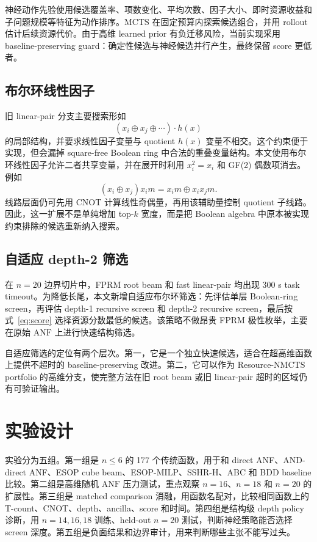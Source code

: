 \documentclass[UTF8,fontset=macnew,11pt]{ctexart}
\newcommand{\method}{Resource-NMCTS}
\newcommand{\anf}{\ensuremath{\mathrm{ANF}}}
\newcommand{\mcts}{\ensuremath{\mathrm{MCTS}}}
\begin{document}
神经动作先验使用候选覆盖率、项数变化、平均次数、因子大小、即时资源收益和子问题规模等特征为动作排序。\mcts{} 在固定预算内探索候选组合，并用 rollout 估计后续资源代价。由于高维 learned prior 有负迁移风险，当前实现采用 baseline-preserving guard：确定性候选与神经候选并行产生，最终保留 score 更低者。

\subsection{布尔环线性因子}

旧 linear-pair 分支主要搜索形如
\begin{equation}
  (x_i\oplus x_j\oplus\cdots)\cdot h(x)
  \label{eq:linear_factor}
\end{equation}
的局部结构，并要求线性因子变量与 quotient $h(x)$ 变量不相交。这个约束便于实现，但会漏掉 square-free Boolean ring 中合法的重叠变量结构。本文使用布尔环线性因子允许二者共享变量，并在展开时利用 $x_i^2=x_i$ 和 GF(2) 偶数项消去。例如
\begin{equation}
  (x_i\oplus x_j)x_i m = x_i m \oplus x_i x_j m .
  \label{eq:boolean_ring}
\end{equation}
线路层面仍可先用 CNOT 计算线性奇偶量，再用该辅助量控制 quotient 子线路。因此，这一扩展不是单纯增加 top-$k$ 宽度，而是把 Boolean algebra 中原本被实现约束排除的候选重新纳入搜索。

\subsection{自适应 depth-2 筛选}

在 $n=20$ 边界切片中，FPRM root beam 和 fast linear-pair 均出现 300 s task timeout。为降低长尾，本文新增自适应布尔环筛选：先评估单层 Boolean-ring screen，再评估 depth-1 recursive screen 和 depth-2 recursive screen，最后按式~\eqref{eq:score} 选择资源分数最低的候选。该策略不做昂贵 FPRM 极性枚举，主要在原始 \anf{} 上进行快速结构筛选。

自适应筛选的定位有两个层次。第一，它是一个独立快速候选，适合在超高维函数上提供不超时的 baseline-preserving 改进。第二，它可以作为 \method{} portfolio 的高维分支，使完整方法在旧 root beam 或旧 linear-pair 超时的区域仍有可验证输出。

\section{实验设计}

实验分为五组。第一组是 $n\leq6$ 的 177 个传统函数，用于和 direct ANF、AND-direct ANF、ESOP cube beam、ESOP-MILP、SSHR-H、ABC 和 BDD baseline 比较。第二组是高维随机 \anf{} 压力测试，重点观察 $n=16$、$n=18$ 和 $n=20$ 的扩展性。第三组是 matched comparison 消融，用函数名配对，比较相同函数上的 T-count、CNOT、depth、ancilla、score 和时间。第四组是结构级 depth policy 诊断，用 $n=14,16,18$ 训练、held-out $n=20$ 测试，判断神经策略能否选择 screen 深度。第五组是负面结果和边界审计，用来判断哪些主张不能写过头。
\end{document}
